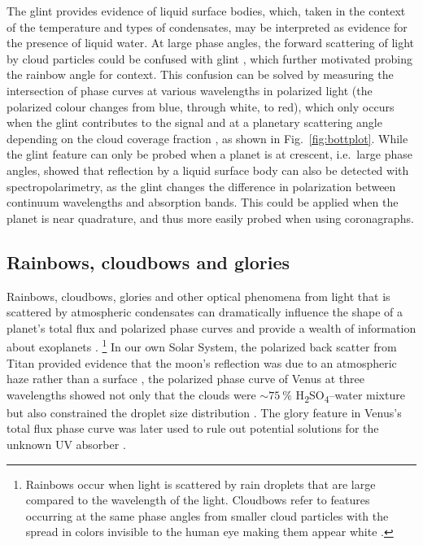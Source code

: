 \documentclass[
    usenatbib,
]{mnras}
\begin{document}
The glint provides evidence of liquid surface bodies, which, taken in the context of the temperature and types of condensates, may be interpreted as evidence for the presence of liquid water.
%
At large phase angles, the forward scattering of light by cloud particles could be confused with glint \citep{Robinson_2010}, which further motivated probing the rainbow angle for context.
%
This confusion can be solved by measuring the intersection of phase curves at various wavelengths in polarized light (the polarized colour changes from blue, through white, to red), which only occurs when the glint contributes to the signal and at a planetary scattering angle depending on the cloud coverage fraction \citep{treesandstam2019}, as shown in Fig.~\ref{fig:bottplot}.
%
While the glint feature can only be probed when a planet is at crescent, i.e.\ large phase angles, \citet{trees2022} showed that reflection by a liquid surface body can also be detected with spectropolarimetry, as the glint changes the difference in polarization between continuum wavelengths and absorption bands. This could be applied when the planet is near quadrature, and thus more easily probed when using coronagraphs.


\subsection{Rainbows, cloudbows and glories}

Rainbows, cloudbows, glories and other optical phenomena from light that is 
scattered by atmospheric condensates can dramatically influence the shape of a planet's total flux and polarized phase curves and provide a wealth of information 
about exoplanets \citep{karalidi2012rainbow, stam2008,Bailey2007,2014A&A...566L...1G}.%
\footnote{
    Rainbows occur when light is scattered by rain droplets that are large compared to the wavelength of the light. Cloudbows refer to features occurring at the same phase angles from smaller cloud particles with the spread in colors invisible to the human eye making them appear white \citet[see][for further discussion]{Bailey2007}.  
}
%
In our own Solar System, the polarized back scatter from Titan provided evidence that the moon's reflection was due to an atmospheric haze rather than a surface \citep{zellner1973polarization}, the polarized phase curve of Venus at three wavelengths showed not only that the clouds were $\sim\qty{75}{\percent}$ H\textsubscript{2}SO\textsubscript{4}--water mixture but also constrained the droplet size distribution \citep{hansenhovenier1974}. 
The glory feature in Venus's total flux phase curve was later used to rule out potential solutions for the unknown UV absorber \citep{petrova2018glory}.
\end{document}

